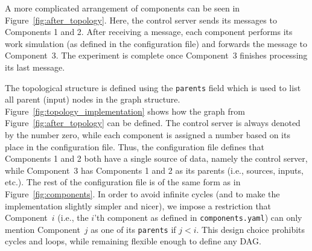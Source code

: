 \documentclass{article}
\begin{document}
A more complicated arrangement of components can be seen in
Figure~\ref{fig:after_topology}. Here, the control server sends its messages to
Components 1 and 2. After receiving a message, each component performs its work
simulation (as defined in the configuration file) and forwards the message to
Component~3. The experiment is complete once Component~3 finishes processing its
last message.

The topological structure is defined using the \texttt{parents} field which is
used to list all parent (input) nodes in the graph structure.
Figure~\ref{fig:topology_implementation} shows how the graph from
Figure~\ref{fig:after_topology} can be defined. The control server is always
denoted by the number zero, while each component is assigned a number based on
its place in the configuration file. Thus, the configuration file defines that
Components 1 and 2 both have a single source of data, namely the control server,
while Component~3 has Components 1 and 2 as its parents (i.e., sources, inputs,
etc.). The rest of the configuration file is of the same form as in
Figure~\ref{fig:components}. In order to avoid infinite cycles (and to make the
implementation slightly simpler and nicer), we impose a restriction that
Component~$i$ (i.e., the $i$'th component as defined in
\texttt{components.yaml}) can only mention Component~$j$ as one of its
\texttt{parents} if $j < i$. This design choice prohibits cycles and loops,
while remaining flexible enough to define any DAG.
\end{document}

